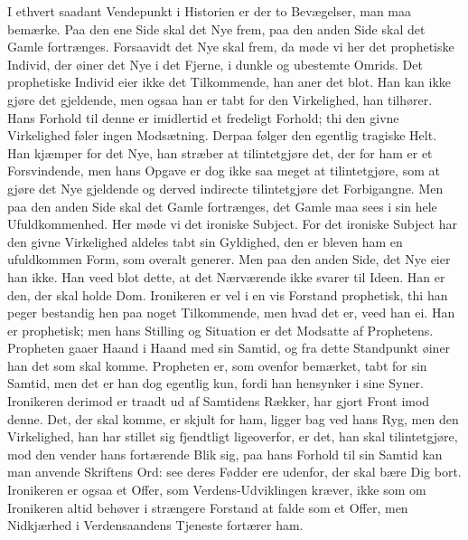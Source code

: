\documentclass[12pt,a4paper]{article}
\begin{document}
I ethvert saadant Vendepunkt i Historien er der to Bevægelser, man maa bemærke. Paa den ene Side skal det Nye frem, paa den anden Side skal det Gamle fortrænges. Forsaavidt det Nye skal frem, da møde vi her det prophetiske Individ, der øiner det Nye i det Fjerne, i dunkle og ubestemte Omrids. Det prophetiske Individ eier ikke det Tilkommende, han aner det blot. Han kan ikke gjøre det gjeldende, men ogsaa han er tabt for den Virkelighed, han tilhører. Hans Forhold til denne er imidlertid et fredeligt Forhold; thi den givne Virkelighed føler ingen Modsætning. Derpaa følger den egentlig tragiske Helt. Han kjæmper for det Nye, han stræber at tilintetgjøre det, der for ham er et Forsvindende, men hans Opgave er dog ikke saa meget at tilintetgjøre, som at gjøre det Nye gjeldende og derved indirecte tilintetgjøre det Forbigangne. Men paa den anden Side skal det Gamle fortrænges, det Gamle maa sees i sin hele Ufuldkommenhed. Her møde vi det ironiske Subject. For det ironiske Subject har den givne Virkelighed aldeles tabt sin Gyldighed, den er bleven ham en ufuldkommen Form, som overalt generer. Men paa den anden Side, det Nye eier han ikke. Han veed blot dette, at det Nærværende ikke svarer til Ideen. Han er den, der skal holde Dom. Ironikeren er vel i en vis Forstand prophetisk, thi han peger bestandig hen paa noget Tilkommende, men hvad det er, veed han ei. Han er prophetisk; men hans Stilling og Situation er det Modsatte af Prophetens. Propheten gaaer Haand i Haand med sin Samtid, og fra dette Standpunkt øiner han det som skal komme. Propheten er, som ovenfor bemærket, tabt for sin Samtid, men det er han dog egentlig kun, fordi han hensynker i sine Syner. Ironikeren derimod er traadt ud af Samtidens Rækker, har gjort Front imod denne. Det, der skal komme, er skjult for ham, ligger bag ved hans Ryg, men den Virkelighed, han har stillet sig fjendtligt ligeoverfor, er det, han skal tilintetgjøre, mod den vender hans fortærende Blik sig, paa hans Forhold til sin Samtid kan man anvende Skriftens Ord: see deres Fødder ere udenfor, der skal bære Dig bort. Ironikeren er ogsaa et Offer, som Verdens-Udviklingen kræver, ikke som om Ironikeren altid behøver i strængere Forstand at falde som et Offer, men Nidkjærhed i Verdensaandens Tjeneste fortærer ham.
\end{document}
